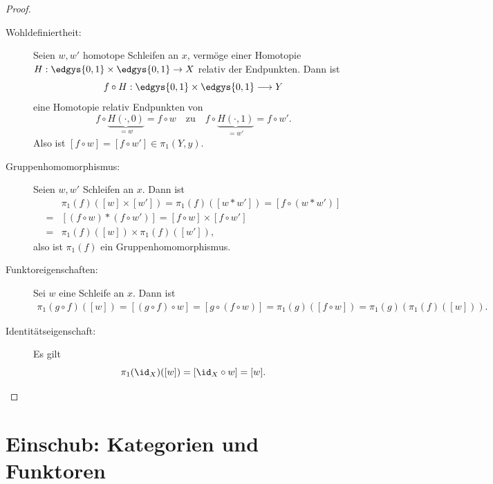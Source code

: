 \documentclass[language=ngerman]{TemplateLecture} %
\begin{document}
\begin{proof}
    \begin{description}
        \item[Wohldefiniertheit:] Seien $w, w'$ homotope Schleifen an $x$, vermöge einer Homotopie $H: \edgys{0,1} \times \edgys{0,1} \to X$ relativ der Endpunkten. Dann ist 
        \begin{equation*}
            f \circ H: \edgys{0,1} \times \edgys{0,1} \longrightarrow Y
        \end{equation*}
        eine Homotopie relativ Endpunkten von 
        \begin{equation*}
            f \circ \underset{=w}{\underbrace{H(\cdot, 0)}} = f \circ w \quad \text{zu} \quad f \circ \underset{=w'}{\underbrace{H(\cdot, 1)}} = f \circ w'.
        \end{equation*}
        Also ist $[f \circ w] = [f \circ w'] \in \pi_1(Y,y)$.
        \item[Gruppenhomomorphismus:] Seien $w, w'$ Schleifen an $x$. Dann ist 
        \begin{align*}
            &\pi_1(f)([w] \times [w']) = \pi_1(f)([w * w']) = [f \circ (w * w')] \\
            =& [(f \circ w) * (f \circ w')] = [f \circ w] \times [f \circ w']\\
            =& \pi_1(f)([w]) \times \pi_1(f)([w']),
        \end{align*}
        also ist $\pi_1(f)$ ein Gruppenhomomorphismus.
        \item[Funktoreigenschaften:] Sei $w$ eine Schleife an $x$. Dann ist 
        \begin{align*}
            \pi_1(g \circ f)([w]) = [(g \circ f) \circ w] = [g \circ (f \circ w)] = \pi_1(g)([f \circ w]) = \pi_1(g)(\pi_1(f)([w])).
        \end{align*}
        \item[Identitätseigenschaft:] Es gilt 
        \begin{equation*}
            \pi_1(\id_X)([w]) = [\id_X \circ w] = [w].
        \end{equation*}
    \end{description}
\end{proof}

\section{Einschub: Kategorien und Funktoren}
\end{document}
